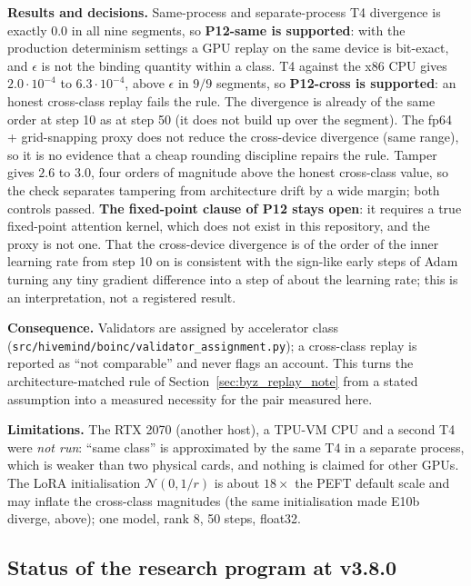 \documentclass[11pt,a4paper]{article}
\begin{document}
\textbf{Results and decisions.} Same-process and separate-process T4 divergence is exactly $0.0$ in all nine segments, so \textbf{P12-same is supported}: with the production determinism settings a GPU replay on the same device is bit-exact, and $\epsilon$ is not the binding quantity within a class. T4 against the x86 CPU gives $2.0\cdot10^{-4}$ to $6.3\cdot10^{-4}$, above $\epsilon$ in $9/9$ segments, so \textbf{P12-cross is supported}: an honest cross-class replay fails the rule. The divergence is already of the same order at step 10 as at step 50 (it does not build up over the segment). The fp64 + grid-snapping proxy does not reduce the cross-device divergence (same range), so it is no evidence that a cheap rounding discipline repairs the rule. Tamper gives $2.6$ to $3.0$, four orders of magnitude above the honest cross-class value, so the check separates tampering from architecture drift by a wide margin; both controls passed. \textbf{The fixed-point clause of P12 stays open}: it requires a true fixed-point attention kernel, which does not exist in this repository, and the proxy is not one. That the cross-device divergence is of the order of the inner learning rate from step 10 on is consistent with the sign-like early steps of Adam turning any tiny gradient difference into a step of about the learning rate; this is an interpretation, not a registered result.

\textbf{Consequence.} Validators are assigned by accelerator class (\texttt{src/hivemind/boinc/validator\_assignment.py}); a cross-class replay is reported as ``not comparable'' and never flags an account. This turns the architecture-matched rule of Section~\ref{sec:byz_replay_note} from a stated assumption into a measured necessity for the pair measured here.

\textbf{Limitations.} The RTX 2070 (another host), a TPU-VM CPU and a second T4 were \emph{not run}: ``same class'' is approximated by the same T4 in a separate process, which is weaker than two physical cards, and nothing is claimed for other GPUs. The LoRA initialisation $\mathcal{N}(0,1/r)$ is about $18\times$ the PEFT default scale and may inflate the cross-class magnitudes (the same initialisation made E10b diverge, above); one model, rank 8, 50 steps, float32.


\subsection{Status of the research program at v3.8.0}
\label{sec:status380}
\end{document}
